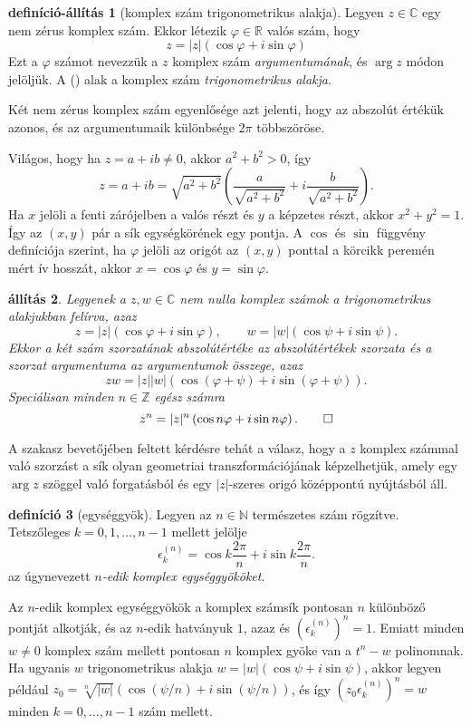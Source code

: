 \documentclass[9pt, a4paper, showtrims]{memoir}
\makeatletter
\renewenvironment{proof}[1][\proofname]
    {\par\pushQED{\qed}%
    \normalfont \topsep6\p@\@plus6\p@\relax
    \trivlist
    \item[\hskip\labelsep
        \itshape
    #1\@addpunct{:}]\ignorespaces}
    {\popQED\endtrivlist\@endpefalse}
\theoremstyle{plain}
\newtheorem{proposition}{állítás}[chapter]
\theoremstyle{remark}
\theoremstyle{definition}
\newtheorem{definition}[proposition]{definíció}
\newtheorem{defprop}[proposition]{definíció-állítás}
\makeatother
\begin{document}
\begin{defprop}[komplex szám trigonometrikus alakja]
    Legyen $z\in \mathbb{C}$ egy nem zérus komplex szám.
    Ekkor létezik $\varphi\in\mathbb{R}$ valós szám, hogy
    \[
        z=
        |z|\left( \cos\varphi+i\sin\varphi \right)\tag{\dag}
    \]
    Ezt a $\varphi$ számot nevezzük a $z$ komplex szám \emph{argumentumának}, és $\arg z$ módon jelöljük.
    A (\dag) alak a komplex szám \emph{trigonometrikus alakja}.

    Két nem zérus komplex szám egyenlősége azt jelenti, hogy az abszolút értékük azonos,
    és az argumentumaik különbsége $2\pi$ többszöröse.
\end{defprop}
\begin{proof}
    Világos, hogy ha $z=a+ib\neq 0$, akkor $a^2+b^2>0$, így
    \[
        z=a+ib
        =
        \sqrt{a^2+b^2}\left( \frac{a}{\sqrt{a^2+b^2}}+i\frac{b}{\sqrt{a^2+b^2}} \right).
    \]
    Ha $x$ jelöli a fenti zárójelben a valós részt és $y$ a képzetes részt,
    akkor $x^2+y^2=1$.
    Így az $\left( x,y \right)$ pár a sík egységkörének egy pontja.
    A $\cos$ és $\sin$ függvény definíciója szerint,
    ha $\varphi$ jelöli az origót az $\left( x,y \right)$ 
    ponttal a körcikk peremén mért ív hosszát,
    akkor $x=\cos\varphi$ és $y=\sin\varphi$.
\end{proof}
\begin{proposition}
    Legyenek a $z,w\in \mathbb{C}$ nem nulla komplex számok a trigonometrikus alakjukban felírva, 
    azaz
    \[
        z=|z|\left( \cos\varphi+i\sin\varphi \right),\qquad 
        w=|w|\left( \cos\psi+i\sin\psi \right).
    \]
    Ekkor a két szám szorzatának abszolútértéke az abszolútértékek szorzata
    és a szorzat argumentuma az argumentumok összege, azaz
    \[
        zw=
        |z||w|\left( \cos\left( \varphi+\psi \right)+i\sin\left( \varphi+\psi \right) \right).
    \]
    Speciálisan minden $n\in\mathbb{Z}$ egész számra
    \[
        z^n=|z|^n\left( \cos n\varphi+i\sin n\varphi \right).\qedhere
    \]
\end{proposition}
A szakasz bevetőjében feltett kérdésre tehát a válasz,
hogy a $z$ komplex számmal való szorzást a sík olyan geometriai transzformációjának képzelhetjük,
amely egy $\arg z$ szöggel való forgatásból és egy $|z|$-szeres origó középpontú nyújtásból áll.
\begin{definition}[egységgyök]
    Legyen az $n\in\mathbb{N}$ természetes szám rögzítve.
    Tetszőleges $k=0,1,\dots,n-1$ mellett jelölje
    \[
        \epsilon_k^{(n)}=\cos k\frac{2\pi}{n}+i\sin k\frac{2\pi}{n}.
    \]
    az úgynevezett \emph{$n$-edik komplex egységgyököket}.
\end{definition}
Az $n$-edik komplex egységgyökök a komplex számsík pontosan $n$ különböző pontját alkotják,
és az $n$-edik hatványuk $1$, azaz 
és $(\epsilon_k^{(n)})^n=1$.
Emiatt minden $w\neq 0$ komplex szám mellett pontosan $n$ komplex gyöke van a $t^n-w$ polinomnak.
Ha ugyanis $w$ trigonometrikus alakja $w=|w|\left( \cos\psi+i\sin\psi \right)$,
akkor legyen például $z_0=\sqrt[n]{|w|}\left( \cos(\psi/n)+i\sin(\psi/n) \right)$,
és így $(z_0\epsilon_k^{(n)})^n=w$ minden $k=0,\dots,n-1$ szám mellett.
\end{document}

